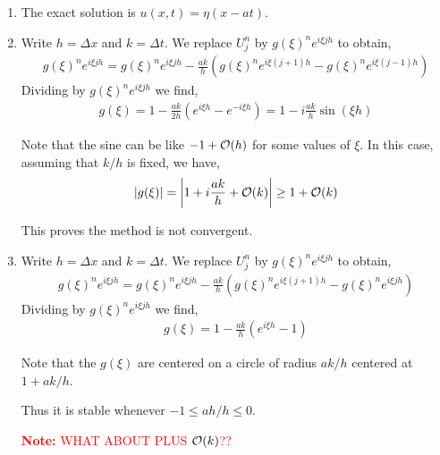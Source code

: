 \documentclass[10pt]{article}
\newcommand{\note}[1]{\textcolor{red}{\textbf{Note:} #1}}
\begin{document}
\begin{solution}[Solution]
\begin{enumerate}[label=(\alph*)]
    \item The exact solution is \( u(x,t) = \eta(x-at) \).
    \item Write \( h = \Delta x \) and \( k = \Delta t \). We replace \( U_j^n \) by \( g(\xi)^n e^{i\xi j h} \) to obtain,
        \begin{align*}
            g(\xi)^n e^{i\xi j h} = g(\xi)^n e^{i\xi j h} - \frac{ak}{h} \left( g(\xi)^n e^{i\xi(j+1)h} - g(\xi)^n e^{i\xi (j-1) h} \right)
        \end{align*}
        Dividing by \( g(\xi)^n e^{i\xi j h} \) we find,
        \begin{align*}
            g(\xi) 
            = 1 - \frac{ak}{2h} \left(e^{i\xi h}-e^{-i\xi h}\right)
            = 1 - i \frac{ak}{h} \sin(\xi h)
        \end{align*}

        Note that the sine can be like \( - 1 + \mathcal{O}( h ) \) for some values of \( \xi \). In this case, assuming that \( k/h \) is fixed, we have,
        \begin{align*}
            |g(\xi)| = \left|1 + i \frac{ak}{h} + \mathcal{O}(k)\right| \geq 1 + \mathcal{O}(k)
        \end{align*}
        
        This proves the method is not convergent.


    \item Write \( h = \Delta x \) and \( k = \Delta t \). We replace \( U_j^n \) by \( g(\xi)^n e^{i\xi j h} \) to obtain,
        \begin{align*}
            g(\xi)^n e^{i\xi j h} = g(\xi)^n e^{i\xi j h} - \frac{ak}{h} \left( g(\xi)^n e^{i\xi(j+1)h} - g(\xi)^n e^{i\xi j h} \right)
        \end{align*}
        Dividing by \( g(\xi)^n e^{i\xi j h} \) we find,
        \begin{align*}
            g(\xi) 
            = 1 - \frac{ak}{h} \left(e^{i\xi h}-1\right)
        \end{align*}

        Note that the \( g(\xi) \) are centered on a circle of radius \( ak/h \) centered at \( 1+ak/h \).

        Thus it is stable whenever \( -1 \leq ah/h \leq 0 \).

        \note{WHAT ABOUT PLUS \( \mathcal{O}(k) \)??}


\end{enumerate}
\end{solution}
\end{document}
